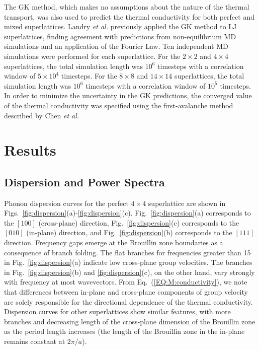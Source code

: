 \documentclass[aps,prb,preprint,preprintnumbers,amsmath,amssymb,floatfix,superscriptaddress]{revtex4}
\begin{document}
The GK method, which makes no assumptions about the nature of the thermal transport, was also used to predict the thermal conductivity for both perfect and mixed superlattices. Landry \textit{et al.} previously applied the GK method to LJ superlattices, finding agreement with predictions from non-equilibrium MD simulations and an application of the Fourier Law.\cite{PhysRevB.79.075316}
Ten independent MD simulations were performed for each superlattice. For the $2 \times 2$ and $4 \times 4$ superlattices, the total  simulation length was $10^6$ timesteps with a correlation window of $5\times 10^4$ timesteps.  For the $8 \times 8$ and $14 \times 14$ superlattices, the total  simulation length was $10^6$ timesteps with a correlation window of $10^5$ timesteps. In order to minimize the uncertainty in the GK predictions, the converged value of the thermal conductivity was specified using the first-avalanche method described by Chen \textit{et al.} \cite{Chen20102392}


\section{Results}\label{SEC:results}
\subsection{Dispersion and Power Spectra}

Phonon dispersion curves for the perfect $4\times4$ superlattice are shown in Figs.~\ref{fig:dispersion}(a)-\ref{fig:dispersion}(c). Fig.~\ref{fig:dispersion}(a) corresponds to the $[1 0 0]$ (cross-plane) direction, Fig.~\ref{fig:dispersion}(c) corresponds to the $[0 1 0]$ (in-plane) direction, and Fig.~\ref{fig:dispersion}(b) corresponds to the $[1 1 1]$ direction. Frequency gaps emerge at the Brouillin zone boundaries as a consequence of branch folding.\cite{PhysRevB.38.1427,PhysRevB.60.2627} The flat branches for frequencies greater than 15 in Fig.~\ref{fig:dispersion}(a) indicate low cross-plane group velocities. The branches in Fig.~\ref{fig:dispersion}(b) and \ref{fig:dispersion}(c), on the other hand, vary strongly with frequency at most wavevectors. From Eq.~(\ref{EQ:M:conductivity}), we note that differences between in-plane and cross-plane components of group velocity are solely responsible for the directional dependence of the thermal conductivity.  Dispersion curves for other superlattices show similar features, with more branches and decreasing length of the cross-plane dimension of the Brouillin zone as the period length increases (the length of the Brouillin zone in the in-plane remains constant at $2\pi/a$).
\end{document}
